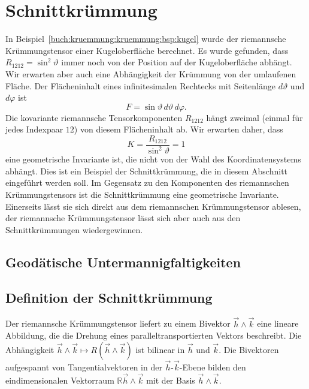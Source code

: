 %
%
\section{Schnittkrümmung
\label{buch:kruemmung:section:schnittkruemmung}}
In Beispiel~\ref{buch:kruemmung:kruemmung:bsp:kugel} wurde der 
riemannsche Krümmungstensor einer Kugeloberfläche berechnet.
Es wurde gefunden, dass $R_{1212}=\sin^2\vartheta$ immer noch von der 
Position auf der Kugeloberfläche abhängt.
Wir erwarten aber auch eine Abhängigkeit der Krümmung von der umlaufenen
Fläche.
Der Flächeninhalt eines infinitesimalen Rechtecks mit Seitenlänge
$d\vartheta$ und $d\varphi$ ist
\[
F
=
\sin\vartheta\, d\vartheta\,d\varphi.
\]
Die kovariante riemannsche Tensorkomponenten $R_{1212}$ hängt zweimal
(einmal für jedes Indexpaar $12$) von diesem Flächeninhalt ab.
Wir erwarten daher, dass
\[
K
=
\frac{R_{1212}}{\sin^2\vartheta}
=
1
\]
eine geometrische Invariante ist, die nicht von der Wahl des
Koordinatensystems abhängt.
Dies ist ein Beispiel der Schnittkrümmung, die in diesem Abschnitt
eingeführt werden soll.
Im Gegensatz zu den Komponenten des riemannschen Krümmungstensors ist
die Schnittkrümmung eine geometrische Invariante.
Einerseits lässt sie sich direkt aus dem riemannschen Krümmungstensor
ablesen, der riemannsche Krümmungstensor lässt sich aber auch aus
den Schnittkrümmungen wiedergewinnen.

%
%
\subsection{Geodätische Untermannigfaltigkeiten
\label{buch:kruemmung:schnittkrüemmung:subsection:geodum}}

%
%
\subsection{Definition der Schnittkrümmung}
Der riemannsche Krümmungstensor liefert zu einem Bivektor
$\vec{h}\wedge\vec{k}$ eine lineare Abbildung, die die Drehung
eines paralleltransportierten Vektors beschreibt.
Die Abhängigkeit $\vec{h}\wedge\vec{k}\mapsto R(\vec{h}\wedge\vec{k})$
ist bilinear in $\vec{h}$ und $\vec{k}$.
Die Bivektoren aufgespannt von Tangentialvektoren in der
$\vec{h}$-$\vec{k}$-Ebene bilden den eindimensionalen Vektorraum
$\mathbb{R}\vec{h}\wedge\vec{k}$ mit der Basis $\vec{h}\wedge\vec{k}$.

